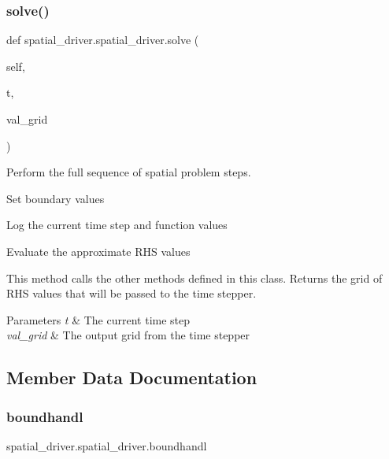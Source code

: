 \subsubsection{\texorpdfstring{solve()}{solve()}}
{\footnotesize\ttfamily def spatial\+\_\+driver.\+spatial\+\_\+driver.\+solve (\begin{DoxyParamCaption}\item[{}]{self,  }\item[{}]{t,  }\item[{}]{val\+\_\+grid }\end{DoxyParamCaption})}



Perform the full sequence of spatial problem steps. 


\begin{DoxyEnumerate}
\item Set boundary values
\item Log the current time step and function values
\item Evaluate the approximate R\+HS values
\end{DoxyEnumerate}

This method calls the other methods defined in this class. Returns the grid of R\+HS values that will be passed to the time stepper. 
\begin{DoxyParams}{Parameters}
{\em t} & The current time step \\
\hline
{\em val\+\_\+grid} & The output grid from the time stepper \\
\hline
\end{DoxyParams}


\subsection{Member Data Documentation}
\mbox{\label{classspatial__driver_1_1spatial__driver_aeb66b87c7c18067c8a9a16b47bcbbd2f}} 
\subsubsection{\texorpdfstring{boundhandl}{boundhandl}}
{\footnotesize\ttfamily spatial\+\_\+driver.\+spatial\+\_\+driver.\+boundhandl}

